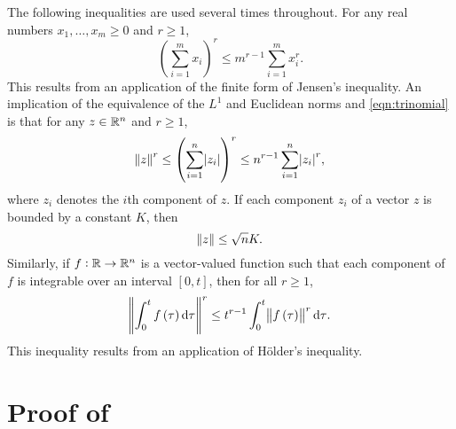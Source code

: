 The following inequalities are used several times throughout.
For any real numbers \(x_1,\hdots,x_m \geq 0\) and \(r \geq 1\),
\begin{equation}
	\left(\sum_{i=1}^m{x_i}\right)^r \leq m^{r-1}\sum_{i=1}^m{x_i^r}.
	\label{eqn:trinomial}
\end{equation}
This results from an application of the finite form of Jensen's inequality.
An implication of the equivalence of the \(L^1\) and Euclidean norms and \eqref{eqn:trinomial} is that for any \(z \in \mathbb{R}^n\) and \(r \geq 1\),
\begin{equation}
	\norm{z}^r \leq \left(\sum_{i = 1}^n{\abs{z_i}}\right)^r \leq n^{r-1}\sum_{i=1}^n{\abs{z_i}^r},
	\label{eqn:norm_trinomial}
\end{equation}
where \(z_i\) denotes the \(i\)th component of \(z\).
If each component \(z_i\) of a vector \(z\) is bounded by a constant \(K\), then
\begin{equation}\label{eqn:bound_vector}
	\norm{z} \leq \sqrt{n} K.
\end{equation}
Similarly, if \(f: \mathbb{R} \to \mathbb{R}^n\) is a vector-valued function such that each component of \(f\) is integrable over an interval \([0,t]\), then for all \(r \geq 1\),
\begin{equation}
	\norm{\int_0^t{f\left(\tau\right)\dif\tau}}^r \leq t^{r-1}\int_0^t{\norm{f\left(\tau\right)}^r\dif\tau}.
	\label{eqn:convex_integral}
\end{equation}
This inequality results from an application of H\"{o}lder's inequality.



\section{Proof of }\label{app:main_thm_proof}

